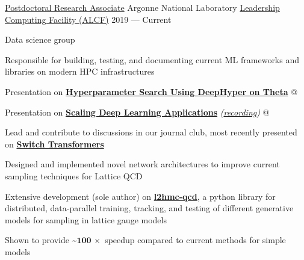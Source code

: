 \begin{cventries}
  \cventry
  {\href{https://www.alcf.anl.gov/about/people/sam-foreman}{\textcolor{awlink}{Postdoctoral Research Associate}}}
  {Argonne National Laboratory}
  {\href{https://www.alcf.anl.gov}{\textcolor{awesome}{Leadership Computing Facility (ALCF)}}}
  {2019 --- Current}
  {
    \begin{cvitems}
    \item {Data science group}
      \begin{cvsubitems}
      \item{Responsible for building, testing, and documenting current ML frameworks and libraries on modern HPC infrastructures}
      \item{Presentation on \href{https://bit.ly/DeepHyperSDL21}{\textbf{Hyperparameter Search Using DeepHyper on
              Theta}} @ \href{https://github.com/argonne-lcf/sdl_ai_workshop}{\emph{\color{awlink}{ALCF: Simulation, Data, and Learning
        Workshop}}}}
      \item{Presentation on \href{https://bit.ly/scaling_CPW21}{\textbf{Scaling Deep Learning Applications}}}
        \textit{(\href{https://youtu.be/ESbk-ESLhqk}{recording})} @
        \href{https://github.com/argonne-lcf/CompPerfWorkshop-2021}{\emph{\color{awlink}{2021 Computational Performance
        Workshop}}}
      \item{Lead and contribute to discussions in our journal club, most recently presented on
        \textbf{\href{https://anl.app.box.com/v/switch-transformers}{Switch Transformers}}}
      \end{cvsubitems}
    \item{Designed and implemented novel network architectures to improve current sampling techniques for Lattice QCD}
    \item{Extensive development (sole author) on
        {\href{https://www.github.com/saforem2/l2hmc-qcd}{\textbf{l2hmc-qcd}}}, a python library for
        distributed, data-parallel training, tracking, and testing of different generative models for sampling in
        lattice gauge models}
      \begin{cvsubitems}
  \item{Shown to provide \textbf{\textasciitilde\(\mathbf{100\,\times}\)} speedup compared to current methods for simple models}
      \end{cvsubitems}
    \end{cvitems}
  }


\end{cventries}
